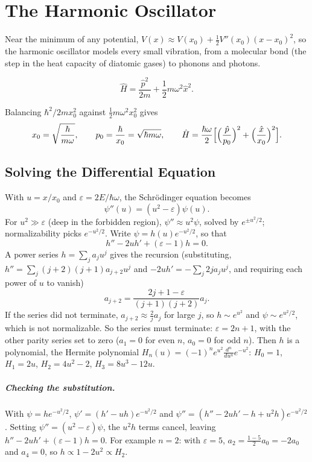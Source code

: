 \chapter{The Harmonic Oscillator}
\label{ch:sho}

Near the minimum of any potential, $V(x)\approx V(x_0) + \frac12V''(x_0)(x-x_0)^2$, so the harmonic oscillator models every small vibration, from a molecular bond (the step in the heat capacity of diatomic gases) to phonons and photons.

\[
    \hat{H} = \frac{\hat{p}^2}{2m} + \frac12m\omega^2\hat{x}^2 .
\]

\begin{definition}
Balancing $\hbar^2/2mx_0^2$ against $\frac12m\omega^2x_0^2$ gives
\[
    x_0 = \sqrt{\frac{\hbar}{m\omega}},
    \qquad
    p_0 = \frac{\hbar}{x_0} = \sqrt{\hbar m\omega},
    \qquad
    \hat{H} = \frac{\hbar\omega}{2}\Bigl[\Bigl(\frac{\hat{p}}{p_0}\Bigr)^2 + \Bigl(\frac{\hat{x}}{x_0}\Bigr)^2\Bigr].
\]
\end{definition}

\section{Solving the Differential Equation}

With $u = x/x_0$ and $\varepsilon = 2E/\hbar\omega$, the Schr\"odinger equation becomes
\[
    \psi''(u) = (u^2-\varepsilon)\psi(u).
\]
For $u^2\gg\varepsilon$ (deep in the forbidden region), $\psi''\approx u^2\psi$, solved by $e^{\pm u^2/2}$; normalizability picks $e^{-u^2/2}$. Write $\psi = h(u)e^{-u^2/2}$, so that
\[
    h'' - 2uh' + (\varepsilon-1)h = 0 .
\]
A power series $h = \sum_ja_ju^j$ gives the recursion (substituting, $h'' = \sum_j(j+2)(j+1)a_{j+2}u^j$ and $-2uh' = -\sum_j2ja_ju^j$, and requiring each power of $u$ to vanish)
\[
    a_{j+2} = \frac{2j+1-\varepsilon}{(j+1)(j+2)}a_j .
\]
If the series did not terminate, $a_{j+2}\approx\frac2ja_j$ for large $j$, so $h\sim e^{u^2}$ and $\psi\sim e^{u^2/2}$, which is not normalizable. So the series must terminate: $\varepsilon = 2n+1$, with the other parity series set to zero ($a_1 = 0$ for even $n$, $a_0 = 0$ for odd $n$). Then $h$ is a polynomial, the Hermite polynomial $H_n(u) = (-1)^ne^{u^2}\frac{d^n}{du^n}e^{-u^2}$: $H_0 = 1$, $H_1 = 2u$, $H_2 = 4u^2-2$, $H_3 = 8u^3-12u$.

\paragraph{Checking the substitution.} With $\psi = he^{-u^2/2}$, $\psi' = (h'-uh)e^{-u^2/2}$ and $\psi'' = (h'' - 2uh' - h + u^2h)e^{-u^2/2}$. Setting $\psi'' = (u^2-\varepsilon)\psi$, the $u^2h$ terms cancel, leaving $h'' - 2uh' + (\varepsilon-1)h = 0$. For example $n = 2$: with $\varepsilon = 5$, $a_2 = \frac{1-5}{2}a_0 = -2a_0$ and $a_4 = 0$, so $h\propto1-2u^2\propto H_2$.

